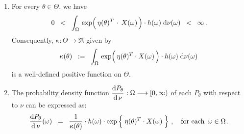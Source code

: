 \begin{definition}
\begin{enumerate}
\item
	For every $\theta \in \Theta$, we have
	\begin{equation*}
	0 \;\; < \;\;
		\int_{\Omega}\,
			\exp\!\left(\,\eta(\theta)^{T} \overset{{\color{white}-}}{\cdot} X(\omega)\,\right) \cdot h(\omega)
		\;\d\nu(\omega)
	\;\; < \;\; \infty\,.
	\end{equation*}
	Consequently, $\kappa : \Theta \longrightarrow \Re$ given by
	\begin{equation*}
	\kappa(\theta)
	\;\; := \;\;
		\int_{\Omega}\,
			\exp\!\left(\,\eta(\theta)^{T} \!\overset{{\color{white}-}}{\cdot}\! X(\omega)\,\right) \cdot h(\omega)
		\;\d\nu(\omega)\,
	\end{equation*}
	is a well-defined positive function on $\Theta$.
\item
	The probability density function
	$\dfrac{\textnormal{d} P_{\theta}}{\textnormal{d}\,\nu} : \Omega \longrightarrow [0,\infty)$
	of each $P_{\theta}$ with respect to $\nu$ can be expressed as:
	\begin{equation*}
	\dfrac{\d P_{\theta}}{\d\,\nu}(\omega)
	\;\; = \;\;
		\dfrac{1}{\kappa(\theta)}
		\cdot
		h(\omega)
		\cdot
		\exp\left\{\; \eta(\theta)^{T} \!\overset{{\color{white}-}}{\cdot}\! X(\omega) \;\right\}
		\,,
		\quad
		\textnormal{for each \,$\omega\in\Omega$}\,.
	\end{equation*}
\end{enumerate}
\end{definition}


